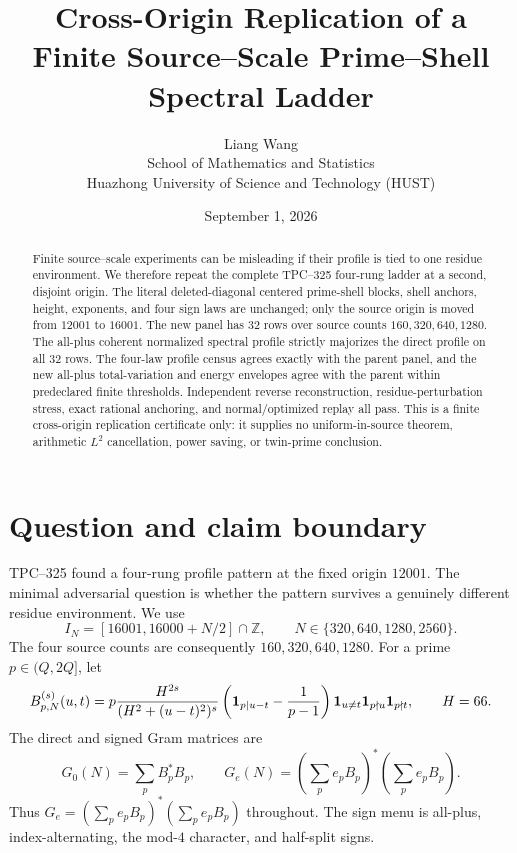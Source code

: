 \documentclass[10pt]{article}
\title{Cross-Origin Replication of a Finite Source--Scale Prime--Shell Spectral Ladder}
\author{Liang Wang\\School of Mathematics and Statistics\\Huazhong University of Science and Technology (HUST)}
\date{September 1, 2026}
\begin{document}
\maketitle

\begin{abstract}
Finite source--scale experiments can be misleading if their profile is tied
to one residue environment.  We therefore repeat the complete TPC--325
four-rung ladder at a second, disjoint origin.  The literal deleted-diagonal
centered prime-shell blocks, shell anchors, height, exponents, and four sign
laws are unchanged; only the source origin is moved from $12001$ to $16001$.
The new panel has $32$ rows over source counts $160,320,640,1280$.  The
all-plus coherent normalized spectral profile strictly majorizes the direct
profile on all $32$ rows.  The four-law profile census agrees exactly with the
parent panel, and the new all-plus total-variation and energy envelopes agree
with the parent within predeclared finite thresholds.  Independent reverse
reconstruction, residue-perturbation stress, exact rational anchoring, and
normal/optimized replay all pass.  This is a finite cross-origin replication
certificate only: it supplies no uniform-in-source theorem, arithmetic
$L^2$ cancellation, power saving, or twin-prime conclusion.
\end{abstract}

\section{Question and claim boundary}

TPC--325 found a four-rung profile pattern at the fixed origin $12001$.
The minimal adversarial question is whether the pattern survives a genuinely
different residue environment.  We use
\[
 I_N=[16001,16000+N/2]\cap\mathbb Z,\qquad
 N\in\{320,640,1280,2560\}.
\]
The four source counts are consequently $160,320,640,1280$.  For a prime
$p\in(Q,2Q]$, let
\begin{equation}
B_{p,N}^{(s)}(u,t)=p\frac{H^{2s}}{(H^2+(u-t)^2)^s}
\left({\bf 1}_{p\mid u-t}-\frac1{p-1}\right)
{\bf 1}_{u\ne t}{\bf 1}_{p\nmid u}{\bf 1}_{p\nmid t},
\qquad H=66.
\end{equation}
The direct and signed Gram matrices are
\[
 G_0(N)=\sum_p B_p^*B_p,\qquad
 G_e(N)=\left(\sum_p e_pB_p\right)^*
                 \left(\sum_p e_pB_p\right).
\]
Thus $G_e=(\sum_p e_pB_p)^*(\sum_p e_pB_p)$ throughout.
The sign menu is all-plus, index-alternating, the mod-$4$ character, and
half-split signs.
\end{document}
